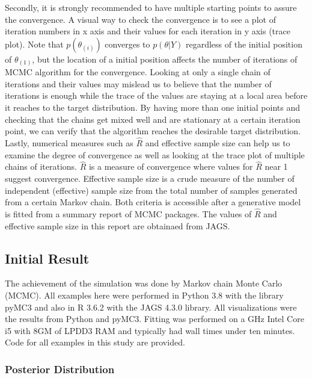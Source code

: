 \documentclass[12pt]{article}
\begin{document}
{Secondly, it is strongly recommended to have multiple starting points to assure the convergence. A visual way to check the convergence is to see a plot of  iteration numbers in x axis and their values for each iteration in y axis (trace plot). Note that $p(\theta_{(i)})$ converges to  $p(\theta|Y)$ regardless of the initial position of $\theta_{(1)}$, but the location of a initial position affects the number of iterations of MCMC algorithm for the convergence. Looking at only a single chain of iterations and their values may mislead us to believe that the number of iterations is enough while the trace of the values are staying at a local area before it reaches to the target distribution. By having more than one initial points and checking that the chains get mixed well and are stationary at a certain iteration point, we can verify that the algorithm reaches the desirable target distribution. 
\\

Lastly, numerical measures such as $\hat{R}$ and effective sample size can help us to examine the degree of convergence as well as looking at the trace plot of multiple chains of iterations. $\hat{R}$ is a measure of convergence where values for $\hat{R}$ near 1 suggest convergence. Effective sample size is a crude measure of the number of independent (effective) sample size from the total number of samples generated from a certain Markov chain. Both criteria is accessible after a generative model is fitted from a summary report of MCMC packages. The values of $\hat{R}$ and effective sample size in this report are obtainaed from JAGS. \\


\subsection{Initial Result} 

The achievement of the simulation was done by Markov chain Monte Carlo (MCMC). All examples here were performed in Python 3.8 with the library pyMC3 \cite{pymc3} and also in R 3.6.2 \cite{r_lan} with the JAGS 4.3.0 \cite{jags} library. All visualizations were the results from Python and pyMC3. Fitting was performed on a GHz Intel Core i5 with 8GM of LPDD3 RAM and typically had wall times under ten minutes. Code for all examples in this study are provided. 

\subsubsection{Posterior Distribution}


}
\end{document}

